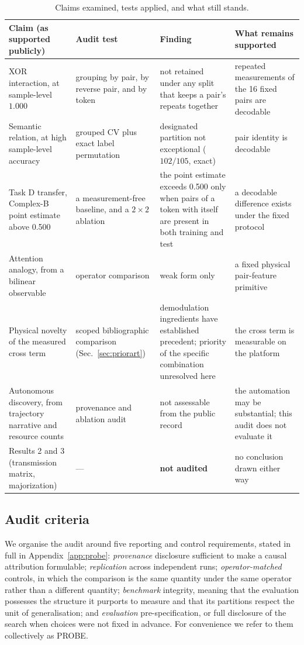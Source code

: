 \documentclass[11pt,a4paper]{article}
\begin{document}
\begin{table}[!htbp]
\centering\small
\caption{Claims examined, tests applied, and what still stands.}
\label{tab:summary}
\setlength{\tabcolsep}{5pt}
\begin{tabular}{L{3.1cm}L{3.3cm}L{4.0cm}L{4.0cm}}
\toprule
Claim (as supported publicly) & Audit test & Finding & What remains supported \\
\midrule
XOR interaction, at sample-level $1.000$ & grouping by pair, by reverse pair,
and by token & not retained under any split that keeps a pair's repeats
together & repeated measurements of the 16 fixed pairs are decodable \\
\addlinespace
Semantic relation, at high sample-level accuracy & grouped CV plus exact label
permutation & designated partition not exceptional ($102/105$, exact) & pair
identity is decodable \\
\addlinespace
Task D transfer, Complex-B point estimate above 0.500 & a measurement-free baseline, and a
$2\times2$ ablation & the point estimate exceeds 0.500 only when pairs of a token with itself are
present in both training and test & a decodable difference exists under the
fixed protocol \\
\addlinespace
Attention analogy, from a bilinear observable & operator comparison
& weak form only & a fixed physical pair-feature primitive \\
\addlinespace
Physical novelty of the measured cross term & scoped bibliographic comparison
(Sec.~\ref{sec:priorart}) & demodulation ingredients have established
precedent; priority of the specific combination unresolved here
& the cross term is measurable on the platform \\
\addlinespace
Autonomous discovery, from trajectory narrative and resource counts &
provenance and ablation audit & not assessable from the public record &
the automation may be substantial; this audit does not evaluate it \\
\addlinespace
Results 2 and 3 (transmission matrix, majorization) & ---
& \textbf{not audited} & no conclusion drawn either way \\
\bottomrule
\end{tabular}
\end{table}

\subsection{Audit criteria}
\label{sec:probe}

We organise the audit around five reporting and control requirements, stated
in full in Appendix~\ref{app:probe}: \emph{provenance} disclosure sufficient to
make a causal attribution formulable; \emph{replication} across independent
runs; \emph{operator-matched} controls, in which the comparison is the same
quantity under the same operator rather than a different quantity;
\emph{benchmark} integrity, meaning that the evaluation possesses the structure
it purports to measure and that its partitions respect the unit of
generalisation; and \emph{evaluation} pre-specification, or full disclosure of
the search when choices were not fixed in advance. For convenience we refer to
them collectively as PROBE.
\end{document}
